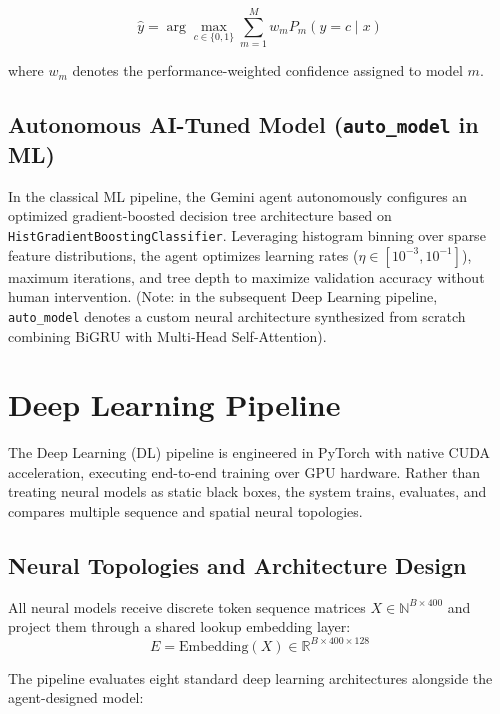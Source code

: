 \documentclass[conference]{IEEEtran}
\begin{document}
\begin{equation}
\hat{y} = \arg\max_{c \in \{0, 1\}} \sum_{m=1}^{M} w_m P_m(y = c \mid x)
\end{equation}

where $w_m$ denotes the performance-weighted confidence assigned to model $m$.

\subsection{Autonomous AI-Tuned Model (\texttt{auto\_model} in ML)}
In the classical ML pipeline, the Gemini agent autonomously configures an optimized gradient-boosted decision tree architecture based on \texttt{HistGradientBoostingClassifier}. Leveraging histogram binning over sparse feature distributions, the agent optimizes learning rates ($\eta \in [10^{-3}, 10^{-1}]$), maximum iterations, and tree depth to maximize validation accuracy without human intervention. (Note: in the subsequent Deep Learning pipeline, \texttt{auto\_model} denotes a custom neural architecture synthesized from scratch combining BiGRU with Multi-Head Self-Attention).

\section{Deep Learning Pipeline}
\label{sec:dl_pipeline}

The Deep Learning (DL) pipeline is engineered in PyTorch with native CUDA acceleration, executing end-to-end training over GPU hardware. Rather than treating neural models as static black boxes, the system trains, evaluates, and compares multiple sequence and spatial neural topologies.

\subsection{Neural Topologies and Architecture Design}
All neural models receive discrete token sequence matrices $X \in \mathbb{N}^{B \times 400}$ and project them through a shared lookup embedding layer:
\begin{equation}
E = \text{Embedding}(X) \in \mathbb{R}^{B \times 400 \times 128}
\end{equation}

The pipeline evaluates eight standard deep learning architectures alongside the agent-designed model:
\end{document}

